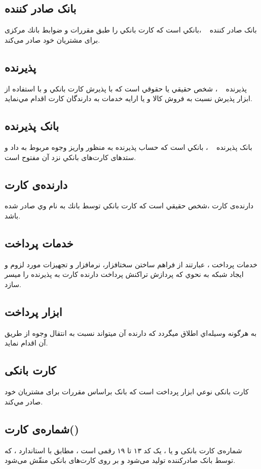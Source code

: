 \documentclass[oneside]{report}
\begin{document}
\subsection{بانک صادر کننده}			
		بانک صادر کننده
		،بانكي است كه كارت بانكي را طبق مقررات و ضوابط بانك مركزی برای مشتريان خود صادر
می‌كند.
\subsection{پذیرنده}
پذیرنده 
	، شخص حقيقي يا حقوقي است كه با پذيرش كارت بانكي و با استفاده از ابزار پذيرش نسبت به
فروش كالا و يا ارايه خدمات به دارندگان كارت اقدام مي‌نمايد.  			 				
	  			 				
\subsection{بانک پذیرنده}
بانک پذیرنده 
	، بانكي است كه حساب پذيرنده به منظور واريز وجوه مربوط به داد و ستدهای كارت‌های‌		بانكي نزد آن مفتوح است. 
		
\subsection{دارنده‌ی کارت}		
		دارنده‌ی کارت 
	  			 				،شخص حقيقي است كه كارت بانكي توسط بانك به نام وي صادر شده باشد.			 		
\subsection{خدمات پرداخت}
خدمات پرداخت 		
			  			 				، عبارتند از فراهم ساختن سختافزار، نرمافزار و تجهيزات مورد لزوم و ايجاد شبكه به نحوي كه
پردازش تراكنش پرداخت دارنده كارت به پذيرنده را ميسر سازد. 
\subsection{ابزار پرداخت}
به هرگونه وسيله‌اي اطلاق ميگردد كه دارنده آن ميتواند نسبت به انتقال وجوه از طريق آن اقدام
نمايد. 
\subsection{کارت بانکی}
کارت بانکی
نوعي ابزار پرداخت است كه بانک براساس مقررات برای مشتريان خود صادر مي‌كند.
\cite{centralbank}

\subsection{شماره‌ی کارت({\normalsize {}}) }
شماره‌ی کارت بانکی و یا 
					{\normalsize {}}
			 ، 
			یک کد ۱۳ تا ۱۹ رقمی است ، مطابق با استاندارد 
					{\normalsize {}}			،
					که توسط بانک صادر‌کننده تولید می‌شود و بر روی کارت‌های بانکی منقّش می‌شود. 
\end{document}
